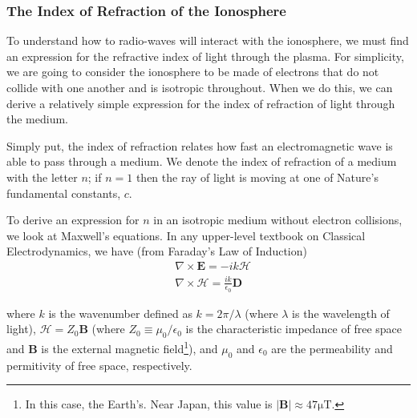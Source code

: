\documentclass[11pt]{article}
\numberwithin{equation}{section}
\begin{document}
    \subsubsection{The Index of Refraction of the Ionosphere} %
    \label{ssub:index_of_refraction}

    To understand how to radio-waves will interact with the ionosphere, we must find an expression for the refractive index of light through the plasma. For simplicity, we are going to consider the ionosphere to be made of electrons that do not collide with one another and is isotropic throughout. When we do this, we can derive a relatively simple expression for the index of refraction of light through the medium.

    Simply put, the index of refraction relates how fast an electromagnetic wave is able to pass through a medium.\cite{jackson1999classical,townsend2000modern} We denote the index of refraction of a medium with the letter $n$; if $n = 1$ then the ray of light is moving at one of Nature's fundamental constants, $c.$

    To derive an expression for $n$ in an isotropic medium without electron collisions, we look at Maxwell's equations. In any upper-level textbook on Classical Electrodynamics, we have (from Faraday's Law of Induction)
    \begin{subequations}
           \begin{align}
       & \nabla \times \mathbf{E} = -i k \mathcal{H} \\& \nabla \times \mathcal{H} = \frac{ik}{\epsilon_0} \mathbf{D} 
    \end{align} 
    \label{eq:curls}
    \end{subequations}

    where $k$ is the wavenumber defined as $k = 2\pi/\lambda$ (where $\lambda $ is the wavelength of light), $\mathcal{H} = Z_0 \mathbf{B}$ (where $Z_0 \equiv \mu_0/\epsilon_0$ is the characteristic impedance of free space and $\mathbf{B}$ is the external magnetic field\footnote{In this case, the Earth's. Near Japan, this value is $|\mathbf{B}| \approx 47 \si{\micro\tesla}$.\cite{maus2010us}}), and $\mu_0$ and $\epsilon_0$ are the permeability and permitivity of free space, respectively.\cite{jackson1999classical,griffiths2005introduction}
\end{document}
